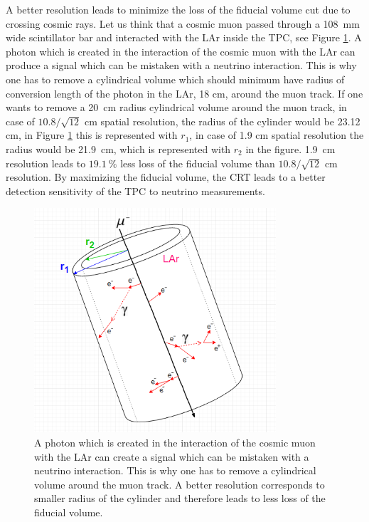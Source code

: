 \documentclass[a4paper]{article}\linespread{1.4}
\begin{document}
A better resolution leads to minimize the loss of the fiducial volume cut due to crossing cosmic rays.
Let us think that a cosmic muon passed through a 108~mm wide scintillator bar and interacted with the LAr inside the TPC, see Figure \ref{fig:cmp}. 
A photon which is created in the interaction of the cosmic muon with the LAr can produce a signal which can be mistaken with a neutrino interaction. This is why one has to remove a cylindrical volume which should minimum have radius of conversion length of the photon in the LAr, 18 cm, around the muon track. If one wants to remove a 20~cm radius cylindrical volume around the muon track, in case of $10.8/\sqrt{12}$ cm spatial resolution, the radius of the cylinder would be 23.12 cm, in Figure \ref{fig:cmp} this is represented with $r_{1}$, in case of 1.9 cm spatial resolution the radius would be 21.9~cm, which is represented with $r_{2}$ in the figure. 
1.9~cm resolution leads to $19.1~\%$ less loss of the fiducial volume than $10.8/\sqrt{12}$ cm resolution. By maximizing the fiducial volume, the CRT leads to a better detection sensitivity of the TPC to neutrino measurements.
\begin{figure}[h!] \hspace*{1.2cm} \includegraphics[width=90mm,scale=2.0]{cmp.png} \caption{A photon which is created in the interaction of the cosmic muon with the LAr can create a signal which can be mistaken with a neutrino interaction. This is why one has to remove a cylindrical volume around the muon track. A better resolution corresponds to smaller radius of the cylinder and therefore leads to less loss of the fiducial volume.}  \label{fig:cmp}\end{figure}
\end{document}
